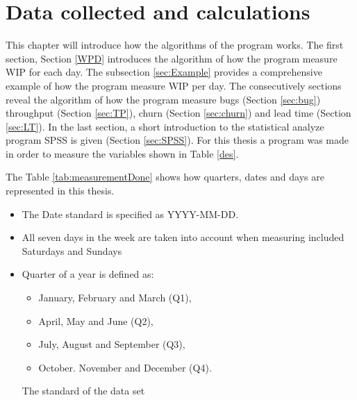\documentclass[UKenglish]{ifimaster}  %
\begin{document}
\chapter{Data collected and calculations}
\label{ch:DCC}
This chapter will introduce how the algorithms of the program works. The first section, Section \ref{WPD} introduces the algorithm of how the program measure WIP for each day. The subsection \ref{sec:Example} provides a comprehensive example of how the program measure WIP per day. The consecutively sections reveal the algorithm of how the program measure bugs (Section \ref{sec:bug}) throughput (Section \ref{sec:TP}),  churn (Section \ref{sec:churn}) and lead time (Section \ref{sec:LT}). In the last section, a short introduction to the statistical analyze program SPSS is given (Section \ref{sec:SPSS}). For this thesis a program was made in order to measure the variables shown in Table \ref{des}. %


The Table \ref{tab:measurementDone} shows how quarters, dates and days are represented in this thesis. 

\begin{table}[!ht]
\centering
\begin{itemize}
\item The Date standard is specified as YYYY-MM-DD.
\item All seven days in the week are taken into account when measuring included Saturdays and Sundays
\item Quarter of a year is defined as: 
\begin{itemize}
\item January, February and March (Q1),
\item April, May and June (Q2),
\item July, August and September (Q3),
\item October. November and December (Q4).
\end{itemize}
\parencite{Quarter}
\caption{The standard of the data set}
\label{tab:measurementDone}
\end{itemize}
\end{table}
\end{document}
